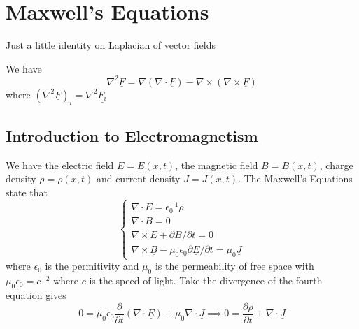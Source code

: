 \section{Maxwell's Equations}
Just a little identity on Laplacian of vector fields
\begin{proposition}
    We have
    $$\nabla^2\underline{F}=\nabla(\nabla\cdot\underline{F})-\nabla\times(\nabla\times\underline{F})$$
    where $(\nabla^2\underline{F})_i=\nabla^2\underline{F_i}$
\end{proposition}
\subsection{Introduction to Electromagnetism}
We have the electric field $\underline{E}=\underline{E}(\underline{x},t)$, the magnetic field $\underline{B}=\underline{B}(\underline{x},t)$, charge density $\rho=\rho(\underline{x},t)$ and current density $\underline{J}=\underline{J}(\underline{x},t)$.
The Maxwell's Equations state that
$$\begin{cases}
    \nabla\cdot\underline{E}=\epsilon_0^{-1}\rho\\
    \nabla\cdot\underline{B}=0\\
    \nabla\times\underline{E}+\partial\underline{B}/\partial t=0\\
    \nabla\times\underline{B}-\mu_0\epsilon_0\partial\underline{E}/\partial t=\mu_0\underline{J}
\end{cases}$$
where $\epsilon_0$ is the permitivity and $\mu_0$ is the permeability of free space with $\mu_0\epsilon_0=c^{-2}$ where $c$ is the speed of light.
Take the divergence of the fourth equation gives
$$0=\mu_0\epsilon_0\frac{\partial}{\partial t}(\nabla\cdot\underline{E})+\mu_0\nabla\cdot\underline{J}\implies 0=\frac{\partial\rho}{\partial t}+\nabla\cdot\underline{J}$$
